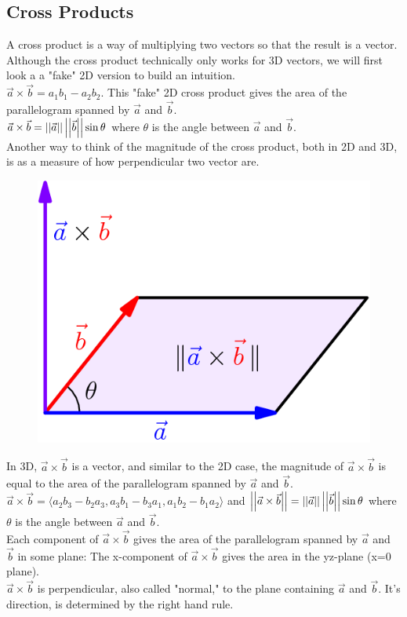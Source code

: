 \subsection{Cross Products}
\noindent
A cross product is a way of multiplying two vectors so that the result is a vector. Although the cross product technically only works for 3D vectors, we will first look a a "fake" 2D version to build an intuition.\\
$\vec{a}\times\vec{b}=a_1b_1-a_2b_2$. This "fake" 2D cross product gives the area of the parallelogram spanned by $\vec{a}$ and $\vec{b}$.\\
$\vec{a}\times\vec{b}=\left|\left|\vec{a}\right|\right|\left|\left|\vec{b}\right|\right|\sin{\theta}$ where $\theta$ is the angle between $\vec{a}$ and $\vec{b}$.\\
Another way to think of the magnitude of the cross product, both in 2D and 3D, is as a measure of how perpendicular two vector are.

\begin{figure}[h]
	\centering
	\includegraphics[scale=0.33]{Images/backgroundReview/CrossProduct}
\end{figure}


\noindent
In 3D, $\vec{a}\times\vec{b}$ is a vector, and similar to the 2D case, the magnitude of $\vec{a}\times\vec{b}$ is equal to the area of the parallelogram spanned by $\vec{a}$ and $\vec{b}$.\\
$\vec{a}\times\vec{b}=\langle a_2b_3-b_2a_3,a_3b_1-b_3a_1,a_1b_2-b_1a_2 \rangle$ and $\left|\left|\vec{a}\times\vec{b}\right|\right|=\left|\left|\vec{a}\right|\right|\left|\left|\vec{b}\right|\right|\sin{\theta}$ where $\theta$ is the angle between $\vec{a}$ and $\vec{b}$.\\
Each component of $\vec{a}\times\vec{b}$ gives the area of the parallelogram spanned by $\vec{a}$ and $\vec{b}$ in some plane: The x-component of $\vec{a}\times\vec{b}$ gives the area in the yz-plane (x=0 plane).\\
$\vec{a}\times\vec{b}$ is perpendicular, also called "normal," to the plane containing $\vec{a}$ and $\vec{b}$. It's direction, is determined by the right hand rule.\\

